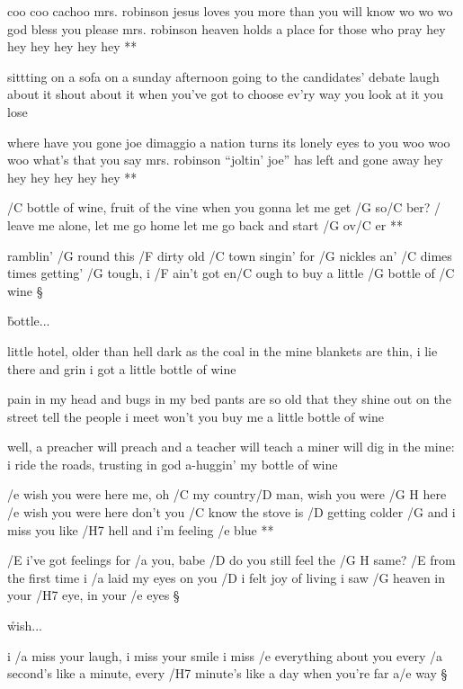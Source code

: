 \R	coo coo cachoo mrs. robinson
	jesus loves you more than you will know wo wo wo
	god bless you please mrs. robinson
	heaven holds a place for those who pray
	hey hey hey hey hey hey **

sittting on a sofa on a sunday afternoon
going to the candidates' debate
laugh about it shout about it when you've got to choose
ev'ry way you look at it you lose

\R	where have you gone joe dimaggio
	a nation turns its lonely eyes to you woo woo woo
	what's that you say mrs. robinson
	``joltin' joe'' has left and gone away
	hey hey hey hey hey hey **




\R  /C bottle of wine, fruit of the vine
    when you gonna let me get /G so/C ber?
    / leave me alone, let me go home
    let me go back and start /G ov/C er **

ramblin' /G round this /F dirty old /C town
singin' for  /G nickles an'  /C dimes
times getting'  /G tough, i /F ain't got en/C ough
to buy a little /G bottle of /C wine \S

\r bottle...

little hotel, older than hell
dark as the coal in the mine
blankets are thin, i lie there and grin
i got a little bottle of wine

\rr

pain in my head and bugs in my bed
pants are so old that they shine
out on the street tell the people i meet
won't you buy me a little bottle of wine 

\rr

well, a preacher will preach and a teacher will teach
a miner will dig in the mine:
i ride the roads, trusting in god
a-huggin' my bottle of wine




\R  /e wish you were here
    me, oh /C my country/D man, wish you were /{G H} here
    /e wish you were here
    don't you /C know the stove is /D getting colder
    /G and i miss you like /H7 hell and i'm feeling /e blue **

/E i've got feelings for /a you, babe
/D do you still feel the /{G H} same?
/E from the first time i /a laid my eyes on you
/D i felt joy of living
i saw /G heaven in your /H7 eye, in your /e eyes \S

\r  wish...

i /a miss your laugh, i miss your smile
i miss /e everything about you
every /a second's like a minute, every /H7 minute's like a day
when you're far a/e way \S

